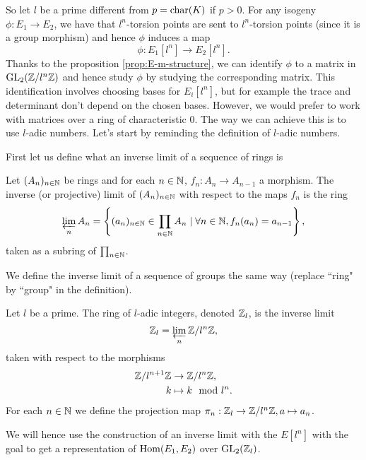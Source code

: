 So let $l$ be a prime different from $p = \operatorname{char}(K)$ if $p > 0$.
For any isogeny
$\phi: E_1 \to E_2$, we have that $l^n$-torsion points are sent to
$l^n$-torsion points (since it is a group morphism)
and hence $\phi$ induces a map
\begin{equation*}
	\phi: E_1[l^n]\to E_2[l^n].
\end{equation*}
Thanks to the proposition \ref{prop:E-m-structure}, we can identify
$\phi$ to a matrix in $\operatorname{GL}_2(\mathbb{Z}/l^n\mathbb{Z})$ and hence study $\phi$ by studying
the corresponding matrix. This identification involves choosing bases
for $E_i[l^n]$,
but for example the trace and determinant don't depend on the chosen bases.
However, we would prefer to work with matrices over a ring of characteristic
0. The way we can achieve this is to use $l$-adic numbers. Let's start by
reminding the definition of $l$-adic numbers.

First let us define what an inverse limit of a sequence of rings is
\begin{definition}
	Let $(A_n)_{n \in \mathbb{N}}$ be rings and for each $n\in \mathbb{N}$,
	$f_n: A_n \to A_{n-1}$ a morphism. The inverse (or projective)
	limit of $(A_n)_{n\in\mathbb{N}}$
	with respect to the maps $f_n$ is the ring
	\begin{equation*}
		\varprojlim_n A_n = 
		\left\{(a_n)_{n \in \mathbb{N}} \in \prod_{n\in\mathbb{N}}A_n \mid
		\forall n \in \mathbb{N}, f_n(a_n) = a_{n-1} \right\},
	\end{equation*}
	taken as a subring of $\prod_{n\in \mathbb{N}}$.

	We define the inverse limit of a sequence of groups the same way
	(replace ``ring" by ``group" in the definition).
\end{definition}

\begin{definition}
	Let $l$ be a prime. The ring of $l$-adic integers, denoted $\mathbb{Z}_l$,
	is the inverse limit
	\begin{equation*}
		\mathbb{Z}_l = \varprojlim_n \mathbb{Z}/l^n\mathbb{Z},
	\end{equation*}
	taken with respect to the morphisms
	\begin{align*}
		\mathbb{Z}/l^{n+1}\mathbb{Z} &\to \mathbb{Z}/l^n\mathbb{Z}, \\
		k &\mapsto k \mod l^n.
	\end{align*}
	For each $n \in \mathbb{N}$ we define the projection map 
	$\pi_n: \mathbb{Z}_l \to \mathbb{Z}/l^n\mathbb{Z}, a \mapsto a_n$.
\end{definition}

We will hence use the construction of an inverse limit with the $E[l^n]$
with the goal to get a representation of $\operatorname{Hom}(E_1, E_2)$ over
$\operatorname{GL}_2(\mathbb{Z}_l)$.

